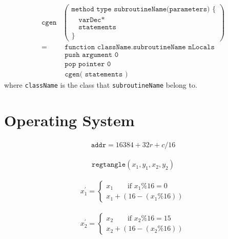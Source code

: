 \documentclass[a4paper]{book}
\begin{document}
\begin{align*}
    \texttt{cgen} &
    \left(
        \begin{array}{l}
            \texttt{method type subroutineName(parameters) \{ } \\
            \texttt{~ ~varDec*} \\
            \texttt{~ ~statements} \\
            \texttt{\} }
        \end{array}
    \right) \\
    = & \texttt{ function className.subroutineName nLocals} \\
      & \texttt{ push argument 0} \\
      & \texttt{ pop pointer 0} \\
      & \texttt{ cgen( statements )}
\end{align*}
where \texttt{className} is the class that \texttt{subroutineName} belong to.


\chapter{Operating System}

\begin{align*}
    \texttt{addr} = 16384 + 32r + c/16
\end{align*}

\begin{align*}
    \texttt{regtangle}(x_1, y_1, x_2, y_2)
\end{align*}

\begin{align*}
    x_1^\prime =
        \begin{cases}
            x_1 \text{~ ~ ~ if } x_1 \% 16 = 0 \\
            x_1 + (16 - (x_1 \% 16))
        \end{cases}
\end{align*}

\begin{align*}
    x_2^\prime =
        \begin{cases}
            x_2 \text{~ ~ ~ if } x_2 \% 16 = 15 \\
            x_2 + (16 - (x_2 \% 16))
        \end{cases}
\end{align*}
\end{document}
